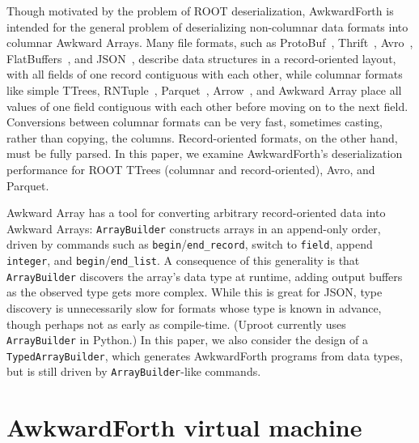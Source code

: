 \documentclass{webofc}
\begin{document}
Though motivated by the problem of ROOT deserialization, AwkwardForth is intended for the general problem of deserializing non-columnar data formats into columnar Awkward Arrays. Many file formats, such as ProtoBuf~\cite{protobuf}, Thrift~\cite{thrift}, Avro~\cite{avro}, FlatBuffers~\cite{flatbuffers}, and JSON~\cite{json}, describe data structures in a record-oriented layout, with all fields of one record contiguous with each other, while columnar formats like simple TTrees, RNTuple~\cite{rntuple}, Parquet~\cite{parquet}, Arrow~\cite{arrow}, and Awkward Array place all values of one field contiguous with each other before moving on to the next field. Conversions between columnar formats can be very fast, sometimes casting, rather than copying, the columns. Record-oriented formats, on the other hand, must be fully parsed. In this paper, we examine AwkwardForth's deserialization performance for ROOT TTrees (columnar and record-oriented), Avro, and Parquet.

Awkward Array has a tool for converting arbitrary record-oriented data into Awkward Arrays: \texttt{ArrayBuilder} constructs arrays in an append-only order, driven by commands such as \texttt{begin}/\texttt{end_record}, switch to \texttt{field}, append \texttt{integer}, and \texttt{begin}/\texttt{end_list}. A consequence of this generality is that \texttt{ArrayBuilder} discovers the array's data type at runtime, adding output buffers as the observed type gets more complex. While this is great for JSON, type discovery is unnecessarily slow for formats whose type is known in advance, though perhaps not as early as compile-time. (Uproot currently uses \texttt{ArrayBuilder} in Python.) In this paper, we also consider the design of a \texttt{TypedArrayBuilder}, which generates AwkwardForth programs from data types, but is still driven by \texttt{ArrayBuilder}-like commands.

\section{AwkwardForth virtual machine}
\end{document}
